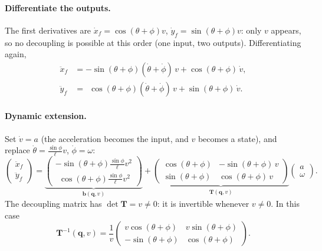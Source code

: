 \documentclass[11pt,a4paper]{article}
\theoremstyle{definition}
\theoremstyle{plain}
\theoremstyle{remark}
\newcommand{\q}{\boldsymbol{q}}
\newcommand{\Tm}{\boldsymbol{T}}
\newcommand{\bb}{\boldsymbol{b}}
\begin{document}
\paragraph{Differentiate the outputs.} The first derivatives are $\dot x_f=\cos(\theta+\phi)v$, $\dot y_f=\sin(\theta+\phi)v$: only $v$ appears, so no decoupling is possible at this order (one input, two outputs). Differentiating again,
\begin{align*}
  \ddot x_f&=-\sin(\theta+\phi)(\dot\theta+\dot\phi)\,v+\cos(\theta+\phi)\,\dot v,\\
  \ddot y_f&=\ \ \cos(\theta+\phi)(\dot\theta+\dot\phi)\,v+\sin(\theta+\phi)\,\dot v .
\end{align*}

\paragraph{Dynamic extension.} Set $\dot v=a$ (the acceleration becomes the input, and $v$ becomes a state), and replace $\dot\theta=\frac{\sin\phi}{\ell}v$, $\dot\phi=\omega$:
\begin{equation}
  \begin{pmatrix}\ddot x_f\\ \ddot y_f\end{pmatrix}
  =\underbrace{\begin{pmatrix}-\sin(\theta+\phi)\frac{\sin\phi}{\ell}v^2\\[2pt] \ \ \cos(\theta+\phi)\frac{\sin\phi}{\ell}v^2\end{pmatrix}}_{\bb(\q,v)}
  +\underbrace{\begin{pmatrix}\cos(\theta+\phi)&-\sin(\theta+\phi)\,v\\ \sin(\theta+\phi)&\cos(\theta+\phi)\,v\end{pmatrix}}_{\Tm(\q,v)}
  \begin{pmatrix}a\\ \omega\end{pmatrix}.
\end{equation}
The decoupling matrix has $\det\Tm=v\neq0$: it is invertible whenever $v\ne0$. In this case
\[
  \Tm^{-1}(\q,v)=\frac1v\begin{pmatrix}v\cos(\theta+\phi)&v\sin(\theta+\phi)\\-\sin(\theta+\phi)&\cos(\theta+\phi)\end{pmatrix}.
\]
\end{document}
